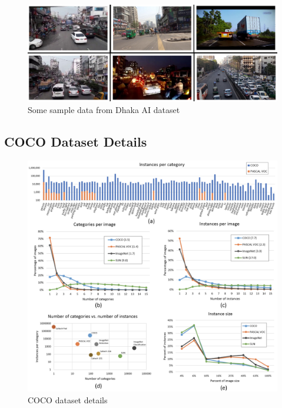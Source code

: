 \begin{figure}[ht]
    \centering
    \includegraphics[max width=\textwidth]{images/ours/dataset-collage.jpg}
   \caption[Sample Data From Dhaka AI Dataset]{  Some sample data from Dhaka AI dataset }
    \label{fig:dataset_collage}
\end{figure}

\subsection{COCO Dataset Details}

\begin{figure}[ht]
    \centering
    \includegraphics[max width=\textwidth]{images/ours/coco-details.png}
   \caption[COCO Dataset Details]{COCO dataset details \cite{lin2015microsoft}}
    \label{fig:coco_details}
\end{figure}

